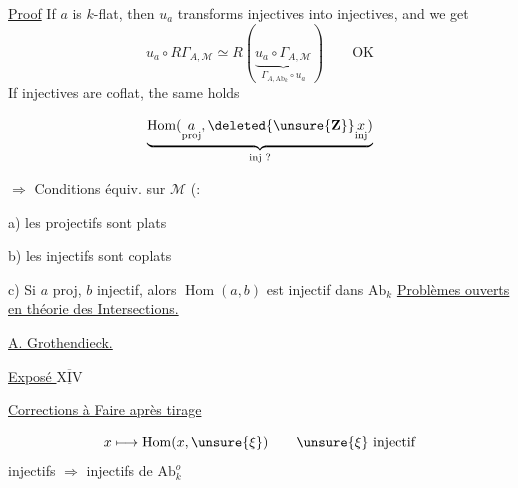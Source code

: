 \uline{Proof} If $a$ is $k$-flat, then $u_a$ transforms injectives into injectives, and we get
\[
u_a\circ R\Gamma_{A,\mathcal M}\simeq
R(\underbrace{u_a\circ\Gamma_{A,\mathcal M}}_{\Gamma_{A,\mathrm{Ab}_k}\circ u_a})
\qquad\mathrm{OK}
\]
If injectives are coflat, the same holds

\[
\underbrace{\operatorname{Hom}(\underset{\mathrm{proj}}a,\deleted{\unsure{\mathbf Z}}\underset{\mathrm{inj}}x)}_{\text{inj ?}}
\]

$\Rightarrow$ Conditions équiv. sur $\mathcal M$ (:

a) les projectifs sont plats

b) les injectifs sont coplats

c) Si $a$ proj, $b$ injectif, alors $\operatorname{Hom}(a,b)$ est injectif dans $\mathrm{Ab}_k$
\uline{Problèmes ouverts en théorie des Intersections.}

\uline{A. Grothendieck.}

\uline{Exposé $\overline{\underline{\mathrm{XIV}}}$}

\uline{Corrections à Faire après tirage}


\[
x\longmapsto\operatorname{Hom}(x,\unsure{\xi})\qquad\unsure{\xi}\text{ injectif}
\]
injectifs $\Longrightarrow$ injectifs de $\mathrm{Ab}_k^o$

